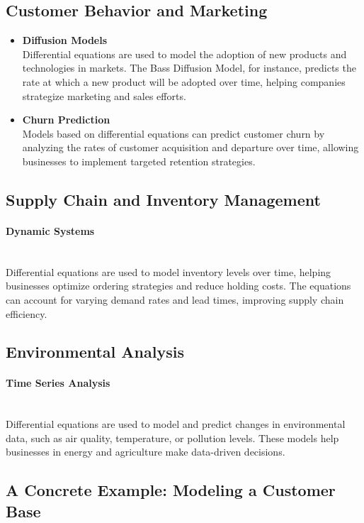 \documentclass[]{article}
\begin{document}
	\subsection{Customer Behavior and Marketing}
	\begin{itemize}
		\item \textbf{Diffusion Models}\noindent\\
		Differential equations are used to model the adoption of new products and technologies in markets.
		The Bass Diffusion Model, for instance, predicts the rate at which a new product will be adopted over time, helping companies strategize marketing and sales efforts.
		\item \textbf{Churn Prediction}\noindent\\
		Models based on differential equations can predict customer churn by analyzing the rates of customer acquisition and departure over time, allowing businesses to implement targeted retention strategies.
	\end{itemize}
	\subsection{Supply Chain and Inventory Management}
	\paragraph{Dynamic Systems}\noindent\\
	Differential equations are used to model inventory levels over time, helping businesses optimize ordering strategies and reduce holding costs.
	The equations can account for varying demand rates and lead times, improving supply chain efficiency.
	\subsection{Environmental Analysis}
	\paragraph{Time Series Analysis}\noindent\\
	Differential equations are used to model and predict changes in environmental data, such as air quality, temperature, or pollution levels.
	These models help businesses in energy and agriculture make data-driven decisions.

	\subsection{A Concrete Example: Modeling a Customer Base}
\end{document}
